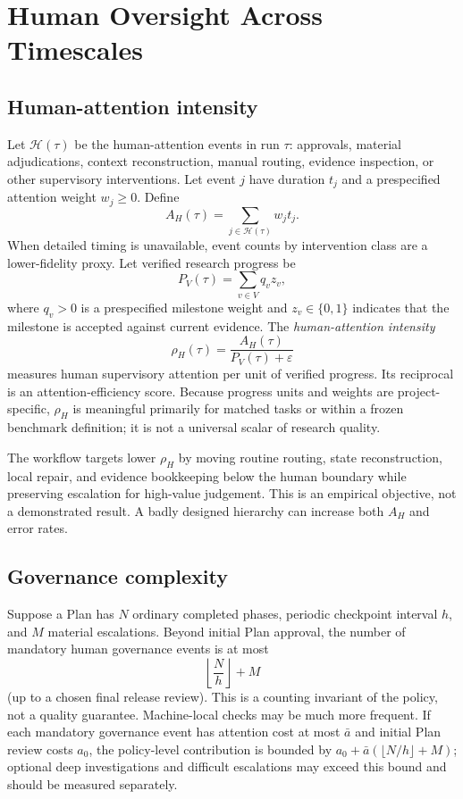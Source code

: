 \documentclass[11pt,a4paper]{article}
\begin{document}
\section{Human Oversight Across Timescales}
\subsection{Human-attention intensity}
Let $\mathcal H(\tau)$ be the human-attention events in run $\tau$: approvals, material adjudications, context reconstruction, manual routing, evidence inspection, or other supervisory interventions. Let event $j$ have duration $t_j$ and a prespecified attention weight $w_j\ge 0$. Define
\[
A_H(\tau)=\sum_{j\in\mathcal H(\tau)} w_j t_j.
\]
When detailed timing is unavailable, event counts by intervention class are a lower-fidelity proxy. Let verified research progress be
\[
P_V(\tau)=\sum_{v\in V} q_v z_v,
\]
where $q_v>0$ is a prespecified milestone weight and $z_v\in\{0,1\}$ indicates that the milestone is accepted against current evidence. The \emph{human-attention intensity}
\[
\rho_H(\tau)=\frac{A_H(\tau)}{P_V(\tau)+\varepsilon}
\]
measures human supervisory attention per unit of verified progress. Its reciprocal is an attention-efficiency score. Because progress units and weights are project-specific, $\rho_H$ is meaningful primarily for matched tasks or within a frozen benchmark definition; it is not a universal scalar of research quality.

The workflow targets lower $\rho_H$ by moving routine routing, state reconstruction, local repair, and evidence bookkeeping below the human boundary while preserving escalation for high-value judgement. This is an empirical objective, not a demonstrated result. A badly designed hierarchy can increase both $A_H$ and error rates.

\subsection{Governance complexity}
Suppose a Plan has $N$ ordinary completed phases, periodic checkpoint interval $h$, and $M$ material escalations. Beyond initial Plan approval, the number of mandatory human governance events is at most
\[
\left\lfloor\frac{N}{h}\right\rfloor+M
\]
(up to a chosen final release review). This is a counting invariant of the policy, not a quality guarantee. Machine-local checks may be much more frequent. If each mandatory governance event has attention cost at most $\bar a$ and initial Plan review costs $a_0$, the policy-level contribution is bounded by $a_0+\bar a(\lfloor N/h\rfloor+M)$; optional deep investigations and difficult escalations may exceed this bound and should be measured separately.
\end{document}
